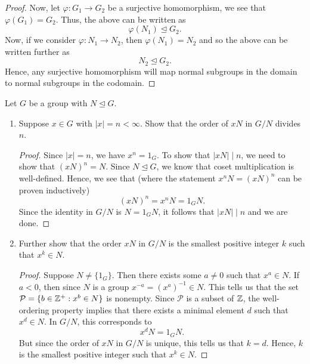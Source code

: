 \documentclass{article}
\begin{document}
\begin{problem}
\begin{enumerate}
\begin{proof}
            Now, let \( \varphi : {G}_{1} \to {G}_{2} \) be a surjective homomorphism, we see that \( \varphi({G}_{1}) = {G}_{2} \). Thus, the above can be written as 
            \[  \varphi({N}_{1}) \trianglelefteq {G}_{2}. \]
            Now, if we consider \( \varphi : {N}_{1} \to {N}_{2} \), then \( \varphi({N}_{1}) = {N}_{2} \) and so the above can be written further as 
            \[  {N}_{2} \trianglelefteq {G}_{2}. \]
            Hence, any surjective homomorphism will map normal subgroups in the domain to normal subgroups in the codomain.
            \end{proof}
    \end{enumerate}
\end{problem}

\begin{problem} Let \( G  \) be a group with \( N \trianglelefteq G  \).
    \begin{enumerate}
        \item[(a)] Suppose \( x \in G  \) with \( |  x  |  = n < \infty   \). Show that the order of \( xN  \) in \( G / N  \) divides \( n  \).
            \begin{proof}
                Since \( | x  |  = n  \), we have \( x^{n} = {1}_{G} \). To show that \( | xN |  \mid n  \), we need to show that \( (xN)^{n} = N  \). Since \( N \trianglelefteq G  \), we know that coset multiplication is well-defined. Hence, we see that (where the statement \( x^{n} N = (xN)^{n} \) can be proven inductively) 
                \[  (xN)^{n} = x^{n} N  = {1}_{G}N. \]
                Since the identity in \( G / N  \) is \( N = {1}_{G} N  \), it follows that \( | x N  |  \mid n \) and we are done. 
            \end{proof}
        \item[(b)] Further show that the order \(  xN  \) in \( G / N  \) is the smallest positive integer \( k  \) such that \( x^{k } \in N  \).
            \begin{proof}
                Suppose \( N \neq \{ 1_G  \}  \). Then there exists some \( a \neq 0  \) such that \( x^{a} \in N  \). If \( a < 0  \), then since \( N  \) is a group \( x^{-a} = (x^{a})^{-1} \in N \). This tells us that the set \( \mathcal{P} = \{  b \in \mathbb{Z}^{+} : x^{b} \in N \}  \) is nonempty. Since \( \mathcal{P} \) is a subset of \( \mathbb{Z}  \), the well-ordering property implies that there exists a minimal element \( d  \) such that \( x^{d} \in  N \). In \( G / N  \), this corresponds to 
    \[  x^{d} N = {1}_{G} N.  \]
    But since the order of \( xN  \) in \( G / N  \) is unique, this tells us that \( k = d  \). Hence, \( k  \) is the smallest positive integer such that \( x^{k} \in N  \).

\end{proof}
\end{enumerate}
\end{problem}
\end{document}
